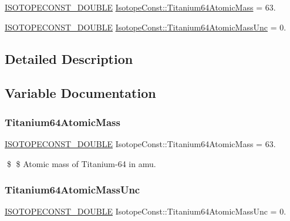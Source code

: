 \begin{DoxyCompactItemize}
\item 
\mbox{\hyperlink{group___isotope_const-_macros_ga8f45a7272ce02c0b4c65c44636ed719a}{I\+S\+O\+T\+O\+P\+E\+C\+O\+N\+S\+T\+\_\+\+D\+O\+U\+B\+LE}} \mbox{\hyperlink{group___isotope_const-_titanium-_ti64_ga50e33001aec47f051dca562644e33230}{Isotope\+Const\+::\+Titanium64\+Atomic\+Mass}} = 63.
\item 
\mbox{\hyperlink{group___isotope_const-_macros_ga8f45a7272ce02c0b4c65c44636ed719a}{I\+S\+O\+T\+O\+P\+E\+C\+O\+N\+S\+T\+\_\+\+D\+O\+U\+B\+LE}} \mbox{\hyperlink{group___isotope_const-_titanium-_ti64_ga5ef0028a83a8e3c42f65de3eff20eeba}{Isotope\+Const\+::\+Titanium64\+Atomic\+Mass\+Unc}} = 0.
\end{DoxyCompactItemize}


\subsection{Detailed Description}


\subsection{Variable Documentation}
\mbox{\label{group___isotope_const-_titanium-_ti64_ga50e33001aec47f051dca562644e33230}} 
\subsubsection{\texorpdfstring{Titanium64\+Atomic\+Mass}{Titanium64AtomicMass}}
{\footnotesize\ttfamily \mbox{\hyperlink{group___isotope_const-_macros_ga8f45a7272ce02c0b4c65c44636ed719a}{I\+S\+O\+T\+O\+P\+E\+C\+O\+N\+S\+T\+\_\+\+D\+O\+U\+B\+LE}} Isotope\+Const\+::\+Titanium64\+Atomic\+Mass = 63.}

\$ \$ Atomic mass of Titanium-\/64 in amu. \mbox{\label{group___isotope_const-_titanium-_ti64_ga5ef0028a83a8e3c42f65de3eff20eeba}} 
\subsubsection{\texorpdfstring{Titanium64\+Atomic\+Mass\+Unc}{Titanium64AtomicMassUnc}}
{\footnotesize\ttfamily \mbox{\hyperlink{group___isotope_const-_macros_ga8f45a7272ce02c0b4c65c44636ed719a}{I\+S\+O\+T\+O\+P\+E\+C\+O\+N\+S\+T\+\_\+\+D\+O\+U\+B\+LE}} Isotope\+Const\+::\+Titanium64\+Atomic\+Mass\+Unc = 0.}

